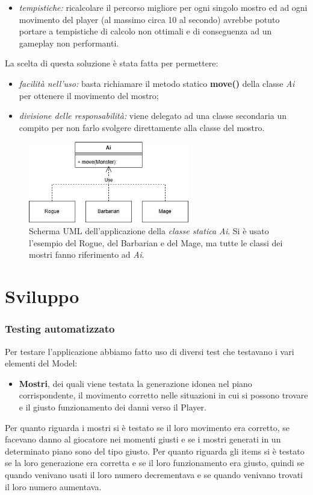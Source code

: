 \documentclass{report}
\begin{document}
\begin{itemize}
    \item \textit{tempistiche:} ricalcolare il percorso migliore per ogni singolo mostro ed ad ogni movimento del player (al massimo circa 10 al secondo) avrebbe potuto portare a tempistiche di calcolo
%
non ottimali e di conseguenza ad un gameplay non performanti.
\end{itemize}

%
La scelta di questa soluzione è stata fatta per permettere:

\begin{itemize}
    \item \textit{facilità nell'uso:} basta richiamare il metodo statico \textbf{move()} della classe \textit{Ai} per ottenere il movimento del mostro;
    \item \textit{divisione delle responsabilità:} viene delegato ad una classe secondaria un compito per non farlo svolgere direttamente alla classe del mostro.
\end{itemize}

\begin{figure}[H]
    \centering
    \includegraphics[width=7cm]{MonsterMovement.png}
    \caption{Scherma UML dell'applicazione della \textit{classe statica Ai}. Si è usato l'esempio del Rogue, del Barbarian e del Mage, ma tutte le classi dei mostri fanno riferimento ad \textit{Ai}.}
\end{figure}

\chapter{Sviluppo}

\subsection{Testing automatizzato}
Per testare l'applicazione abbiamo fatto uso di diversi test che testavano i vari elementi del Model:
\begin{itemize}
    \item \textbf{Mostri}, dei quali viene testata la generazione idonea nel piano corrispondente, il movimento corretto nelle situazioni in cui si possono trovare e il giusto funzionamento dei danni verso il Player.
\end{itemize} 
%
Per quanto riguarda i mostri si è testato se il loro movimento era corretto, se facevano danno al giocatore nei momenti giusti e se i mostri generati in un determinato piano sono del tipo giusto.
%
Per quanto riguarda gli items si è testato se la loro generazione era corretta e se il loro funzionamento era giusto, quindi se quando venivano usati il loro numero decrementava e se quando venivano trovati il loro numero aumentava.
%
\end{document}
